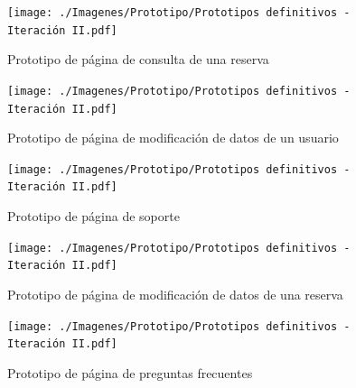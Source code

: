 \begin{figure}[H]
    \centering
    \texttt{[image: ./Imagenes/Prototipo/Prototipos definitivos - Iteración II.pdf]}
    \caption{Prototipo de página de consulta de una reserva}
    \label{fig:prot2_reservas_mod}
\end{figure}

\begin{figure}[H]
    \centering
    \texttt{[image: ./Imagenes/Prototipo/Prototipos definitivos - Iteración II.pdf]}
    \caption{Prototipo de página de modificación de datos de un usuario}
    \label{fig:prot2_usuario_mod}
\end{figure}

\begin{figure}[H]
    \centering
    \texttt{[image: ./Imagenes/Prototipo/Prototipos definitivos - Iteración II.pdf]}
    \caption{Prototipo de página de soporte}
    \label{fig:prot2_soporte}
\end{figure}

\begin{figure}[H]
    \centering
    \texttt{[image: ./Imagenes/Prototipo/Prototipos definitivos - Iteración II.pdf]}
    \caption{Prototipo de página de modificación de datos de una reserva}
    \label{fig:prot2_reserva_mod}
\end{figure}

\begin{figure}[H]
    \centering
    \texttt{[image: ./Imagenes/Prototipo/Prototipos definitivos - Iteración II.pdf]}
    \caption{Prototipo de página de preguntas frecuentes}
    \label{fig:prot2_faq}
\end{figure}
